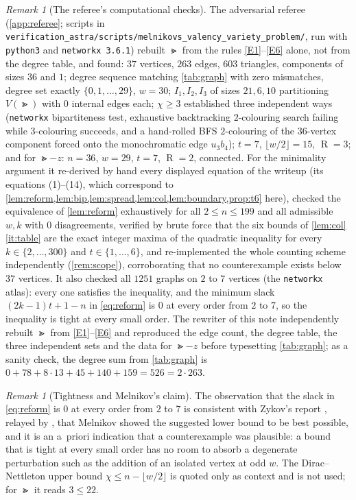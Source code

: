 \documentclass[11pt,a4paper]{article}
\theoremstyle{plain}
\theoremstyle{definition}
\theoremstyle{remark}
\newtheorem{remark}[theorem]{Remark}
\newcommand{\fl}[1]{\lfloor #1\rfloor}
\newcommand{\RHS}{\operatorname{R}}
\begin{document}
\begin{remark}[The referee's computational checks]\label{rem:checks}
The adversarial referee (\cref{app:referee}; scripts in \texttt{verification\_astra/scripts/melnikovs\_valency\_variety\_problem/}, run with \texttt{python3} and \texttt{networkx~3.6.1}) rebuilt $\Gt$ from the rules \ref{E1}--\ref{E6} alone, not from the degree table, and found: $37$ vertices, $263$ edges, $603$ triangles, components of sizes $36$ and $1$; degree sequence matching \cref{tab:graph} with zero mismatches, degree set exactly $\{0,1,\dots,29\}$, $w=30$; $I_1,I_2,I_3$ of sizes $21,6,10$ partitioning $V(\Gt)$ with $0$ internal edges each; $\chi\ge3$ established three independent ways (\texttt{networkx} bipartiteness test, exhaustive backtracking $2$-colouring search failing while $3$-colouring succeeds, and a hand-rolled BFS $2$-colouring of the $36$-vertex component forced onto the monochromatic edge $u_3b_4$); $t=7$, $\fl{w/2}=15$, $\RHS=3$; and for $\Gt-z$: $n=36$, $w=29$, $t=7$, $\RHS=2$, connected. For the minimality argument it re-derived by hand every displayed equation of the writeup (its equations (1)--(14), which correspond to \cref{lem:reform,lem:bip,lem:spread,lem:col,lem:boundary,prop:t6} here), checked the equivalence of \cref{lem:reform} exhaustively for all $2\le n\le199$ and all admissible $w,k$ with $0$ disagreements, verified by brute force that the six bounds of \cref{lem:col}\ref{it:table} are the exact integer maxima of the quadratic inequality for every $k\in\{2,\dots,300\}$ and $t\in\{1,\dots,6\}$, and re-implemented the whole counting scheme independently (\cref{rem:scope}), corroborating that no counterexample exists below $37$ vertices. It also checked all $1251$ graphs on $2$ to $7$ vertices (the \texttt{networkx} atlas): every one satisfies the inequality, and the minimum slack $(2k-1)t+1-n$ in \eqref{eq:reform} is $0$ at every order from $2$ to $7$, so the inequality is tight at every small order. The rewriter of this note independently rebuilt $\Gt$ from \ref{E1}--\ref{E6} and reproduced the edge count, the degree table, the three independent sets and the data for $\Gt-z$ before typesetting \cref{tab:graph}; as a sanity check, the degree sum from \cref{tab:graph} is $0+78+8\cdot13+45+140+159=526=2\cdot263$.
\end{remark}

\begin{remark}[Tightness and Melnikov's claim]\label{rem:tight}
The observation that the slack in \eqref{eq:reform} is $0$ at every order from $2$ to $7$ is consistent with Zykov's report \cite{Z}, relayed by \cite{OPG}, that Melnikov showed the suggested lower bound to be best possible, and it is an a~priori indication that a counterexample was plausible: a bound that is tight at every small order has no room to absorb a degenerate perturbation such as the addition of an isolated vertex at odd $w$. The Dirac--Nettleton upper bound $\chi\le n-\fl{w/2}$ \cite{D,N} is quoted only as context and is not used; for $\Gt$ it reads $3\le22$.
\end{remark}
\end{document}
